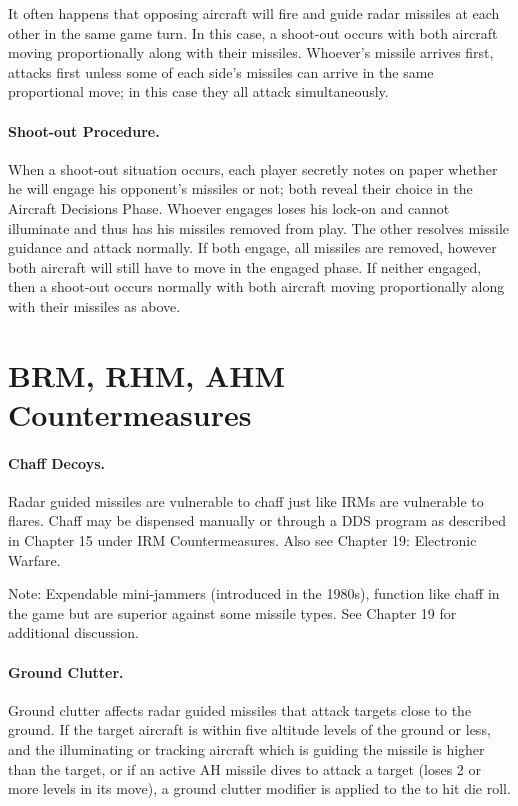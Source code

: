 It often happens that opposing aircraft will fire and guide radar missiles at each other in the same game turn. In this case, a shoot-out occurs with both aircraft moving proportionally along with their missiles. Whoever’s missile arrives first, attacks first unless some of each side's missiles can arrive in the same proportional move; in this case they all attack simultaneously.

\paragraph{Shoot-out Procedure.} When a shoot-out situation occurs, each player secretly notes on paper whether he will engage his opponent's missiles or not; both reveal their choice in the Aircraft Decisions Phase. Whoever engages loses his lock-on and cannot illuminate and thus has his missiles removed from play. The other resolves missile guidance and attack normally. If both engage, all missiles are removed, however both aircraft will still have to move in the engaged phase. If neither engaged, then a shoot-out occurs normally with both aircraft moving proportionally along with their missiles as above.

\section{BRM, RHM, AHM Countermeasures}

\paragraph{Chaff Decoys.} Radar guided missiles are vulnerable to chaff just like IRMs are vulnerable to flares. Chaff may be dispensed manually or through a DDS program as described in Chapter 15 under IRM Countermeasures. Also see Chapter 19: Electronic Warfare.

Note: Expendable mini-jammers (introduced in the 1980s), function like chaff in the game but are superior against some missile types. See Chapter 19 for additional discussion.

\paragraph{Ground Clutter.} Ground clutter affects radar guided missiles that attack targets close to the ground. If the target aircraft is within five altitude levels of the ground or less, and the illuminating or tracking aircraft which is guiding the missile is higher than the target, or if an active AH missile dives to attack a target (loses 2 or more levels in its move), a ground clutter modifier is applied to the to hit die roll.

